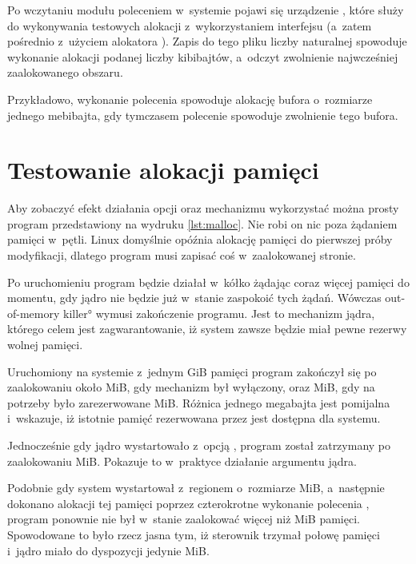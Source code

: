 Po wczytaniu modułu poleceniem  w~systemie
pojawi się urządzenie , które służy do wykonywania
testowych alokacji z~wykorzystaniem interfejsu  
(a~zatem pośrednio z~użyciem alokatora ).  Zapis do tego
pliku liczby naturalnej spowoduje wykonanie alokacji podanej liczby
kibibajtów, a~odczyt zwolnienie najwcześniej zaalokowanego obszaru.

Przykładowo, wykonanie polecenia 
spowoduje alokację bufora o~rozmiarze jednego mebibajta, gdy tymczasem
polecenie  spowoduje zwolnienie tego bufora.


\section{Testowanie alokacji pamięci}

Aby zobaczyć efekt działania opcji  oraz mechanizmu
 wykorzystać można prosty program  przedstawiony
na wydruku \ref{lst:malloc}.  Nie robi on nic poza żądaniem pamięci
w~pętli.  Linux domyślnie opóźnia alokację pamięci do pierwszej próby
modyfikacji, dlatego program musi zapisać coś w~zaalokowanej stronie.



Po uruchomieniu program będzie działał w~kółko żądając coraz więcej
pamięci do momentu, gdy jądro nie będzie już w~stanie zaspokoić tych
żądań.  Wówczas \ang*{out-of-memory killer} wymusi zakończenie
programu.  Jest to mechanizm jądra, którego celem jest
zagwarantowanie, iż system zawsze będzie miał pewne rezerwy wolnej
pamięci.

Uruchomiony na systemie z~jednym \unit{GiB} pamięci program zakończył
się po zaalokowaniu około \unit[965]{MiB}, gdy mechanizm  był
wyłączony, oraz \unit[964]{MiB}, gdy na potrzeby  było
zarezerwowane \unit[512]{MiB}.  Różnica jednego megabajta jest
pomijalna i~wskazuje, iż istotnie pamięć rezerwowana przez 
jest dostępna dla systemu.

Jednocześnie gdy jądro wystartowało z~opcją , program
został zatrzymany po zaalokowaniu \unit[477]{MiB}.  Pokazuje to
w~praktyce działanie argumentu  jądra.

Podobnie gdy system wystartował z~regionem  o~rozmiarze
\unit[512]{MiB}, a~następnie dokonano alokacji tej pamięci poprzez
czterokrotne wykonanie polecenia ,
program  ponownie nie był w~stanie zaalokować więcej niż
\unit[454]{MiB} pamięci.  Spowodowane to było rzecz jasna tym, iż
sterownik  trzymał połowę pamięci i~jądro miało do
dyspozycji jedynie \unit[512]{MiB}.

